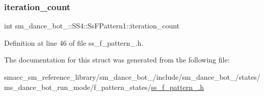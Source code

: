 \subsubsection{\texorpdfstring{iteration\+\_\+count}{iteration\_count}}
{\footnotesize\ttfamily int sm\+\_\+dance\+\_\+bot\+\_\+::\+S\+S4\+::\+Ss\+F\+Pattern1\+::iteration\+\_\+count}



Definition at line 46 of file ss\+\_\+f\+\_\+pattern\+\_.\+h.



The documentation for this struct was generated from the following file\+:\begin{DoxyCompactItemize}
\item 
smacc\+\_\+sm\+\_\+reference\+\_\+library/sm\+\_\+dance\+\_\+bot\+\_/include/sm\+\_\+dance\+\_\+bot\+\_/states/ms\+\_\+dance\+\_\+bot\+\_\+run\+\_\+mode/f\+\_\+pattern\+\_\+states/\hyperlink{2_2include_2sm__dance__bot__2_2states_2ms__dance__bot__run__mode_2f__pattern__states_2ss__f__pattern__1_8h}{ss\+\_\+f\+\_\+pattern\+\_.\+h}\end{DoxyCompactItemize}
